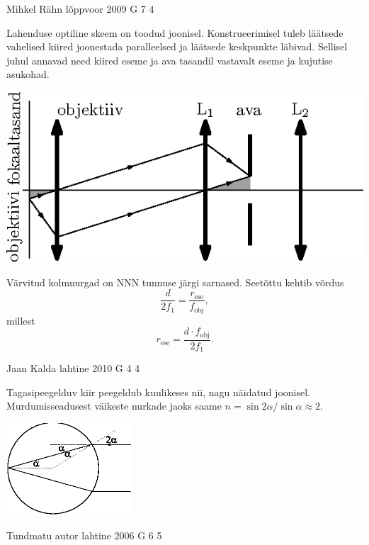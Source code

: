 \documentclass[11pt]{article}
\begin{document}
{%
{Mihkel Rähn} %
{lõppvoor} %
{2009} %
{G 7} %
{4} %
{

\ifSolution
Lahenduse optiline skeem on toodud joonisel. Konstrueerimisel tuleb
läätsede vahelised kiired joonestada paralleelsed ja läätsede keskpunkte läbivad.
Sellisel juhul annavad need kiired eseme ja ava tasandil vastavalt eseme ja kujutise
asukohad.

\begin{center}
	\includegraphics[width=0.8\linewidth]{2009-v3g-07-G_konfokaalne_mikroskoop_lah.eps}
\end{center}

Värvitud kolmnurgad on NNN tunnuse järgi sarnased. Seetõttu kehtib võrdus
\[
\frac{d}{2f_1}=\frac{r_{\mathrm{ese}}}{f_{\mathrm{obj}}},
\]
millest
\[
r_{\mathrm{ese}}=\frac{d\cdot f_{\mathrm{obj}}}{2f_1}.
\]
\fi
}

{Jaan Kalda} %
{lahtine} %
{2010} %
{G 4} %
{4} %
{

\ifSolution
Tagasipeegelduv kiir peegeldub kuulikeses nii, nagu näidatud joonisel. Murdumisseadusest väikeste nurkade jaoks saame
$n=\sin 2\alpha/\sin\alpha \approx 2.$
\begin{center}
	\includegraphics[width=0.35\textwidth]{2010-lahg-04-kuulike.eps}
\end{center}
\fi
}

{Tundmatu autor} %
{lahtine} %
{2006} %
{G 6} %
{5} %
{

}}
\end{document}
